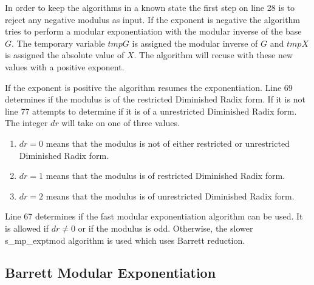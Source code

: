 \documentclass[b5paper]{book}
\begin{document}
In order to keep the algorithms in a known state the first step on line 28 is to reject any negative modulus as input.  If the exponent is
negative the algorithm tries to perform a modular exponentiation with the modular inverse of the base $G$.  The temporary variable $tmpG$ is assigned
the modular inverse of $G$ and $tmpX$ is assigned the absolute value of $X$.  The algorithm will recuse with these new values with a positive
exponent.

If the exponent is positive the algorithm resumes the exponentiation.  Line 69 determines if the modulus is of the restricted Diminished Radix 
form.  If it is not line 77 attempts to determine if it is of a unrestricted Diminished Radix form.  The integer $dr$ will take on one
of three values.

\begin{enumerate}
\item $dr = 0$ means that the modulus is not of either restricted or unrestricted Diminished Radix form.
\item $dr = 1$ means that the modulus is of restricted Diminished Radix form.
\item $dr = 2$ means that the modulus is of unrestricted Diminished Radix form.
\end{enumerate}

Line 67 determines if the fast modular exponentiation algorithm can be used.  It is allowed if $dr \ne 0$ or if the modulus is odd.  Otherwise,
the slower s\_mp\_exptmod algorithm is used which uses Barrett reduction.  

\subsection{Barrett Modular Exponentiation}
\end{document}

